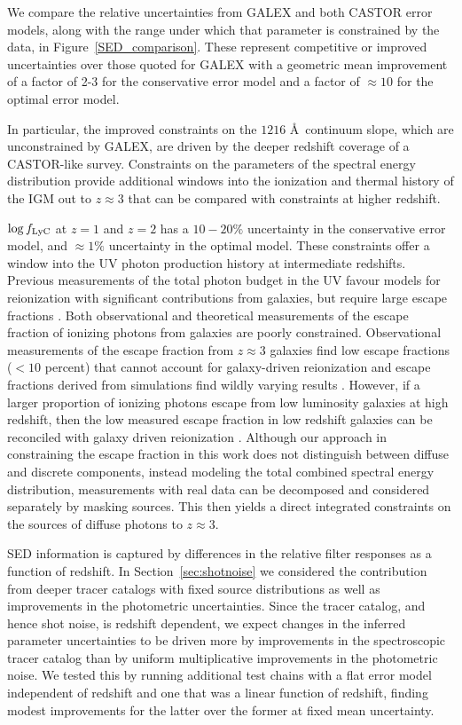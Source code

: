\documentclass[fleqn,usenatbib]{mnras}
\begin{document}
We compare the relative uncertainties from {\small GALEX} and both {\small CASTOR} error models, along with the range under which that parameter is constrained by the data, in Figure~\ref{SED_comparison}. These represent competitive or improved  uncertainties over those quoted for {\small GALEX} with a geometric mean improvement of a factor of 2-3 for the conservative error model and a factor of $\approx 10$ for the optimal error model. 

In particular, the improved constraints on the $1216$ \AA\ continuum slope, which are unconstrained by {\small GALEX}, are driven by the deeper redshift coverage of a {\small CASTOR}-like survey. Constraints on the parameters of the spectral energy distribution provide additional windows into the ionization and thermal history of the IGM out to $z \approx 3$ that can be compared with constraints at higher redshift.


$\log f_{\rm LyC}$ at $z=1$ and $z=2$ has a $10-20\%$ uncertainty in the conservative error model, and $\approx 1\%$ uncertainty in the optimal model. These constraints offer a window into the UV photon production history at intermediate redshifts. Previous measurements of the total photon budget in the UV favour models for reionization with significant contributions from galaxies, but require large escape fractions \citep{Finkelstein2012}. Both observational and theoretical measurements of the escape fraction of ionizing photons from galaxies are poorly constrained. Observational measurements of the escape fraction from $z\approx 3$ galaxies find low escape fractions ($< 10$ percent) that cannot account for galaxy-driven reionization \citep{siana10,siana15} and escape fractions derived from simulations find wildly varying results \citep{gnedin08,wise09,anderson17}. However, if a larger proportion of ionizing photons escape from low luminosity galaxies at high redshift, then the low measured escape fraction in low redshift galaxies can be reconciled with galaxy driven reionization \citep{Escude,McQuinn_2013}. Although our approach in constraining the escape fraction in this work does not distinguish between diffuse and discrete components, instead modeling the total combined spectral energy distribution, measurements with real data can be decomposed and considered separately by masking sources. This then yields a direct integrated constraints on the sources of diffuse photons to $z \approx 3$.


SED information is captured by differences in the relative filter responses as a function of redshift. In Section~\ref{sec:shotnoise} we considered the contribution from deeper tracer catalogs with fixed source distributions as well as improvements in the photometric uncertainties. Since the tracer catalog, and hence shot noise, is redshift dependent, we expect changes in the inferred parameter uncertainties to be driven more by improvements in the spectroscopic tracer catalog than by uniform multiplicative improvements in the photometric noise. We tested this by running additional test chains with a flat error model independent of redshift and one that was a linear function of redshift, finding modest improvements for the latter over the former at fixed mean uncertainty. 
\end{document}
